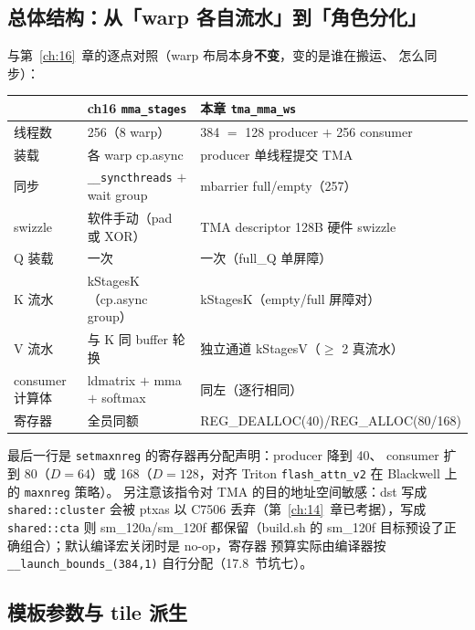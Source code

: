 \subsection{总体结构：从「warp 各自流水」到「角色分化」}

与第~\ref{ch:16}~章的逐点对照（warp 布局本身\textbf{不变}，变的是谁在搬运、
怎么同步）：

\begin{center}
\begin{tabular}{lll}
\toprule
 & ch16 \texttt{mma\_stages} & 本章 \texttt{tma\_mma\_ws} \\
\midrule
线程数 & 256（8 warp） & 384 $=$ 128 producer $+$ 256 consumer \\
装载 & 各 warp cp.async & producer 单线程提交 TMA \\
同步 & \texttt{\_\allowbreak{}\_\allowbreak{}syncthreads} $+$ wait group & mbarrier full/empty（257） \\
swizzle & 软件手动（pad 或 XOR） & TMA descriptor 128B 硬件 swizzle \\
Q 装载 & 一次 & 一次（full\_Q 单屏障） \\
K 流水 & kStagesK（cp.async group） & kStagesK（empty/full 屏障对） \\
V 流水 & 与 K 同 buffer 轮换 & 独立通道 kStagesV（$\ge$ 2 真流水） \\
consumer 计算体 & ldmatrix $+$ mma $+$ softmax & 同左（逐行相同） \\
寄存器 & 全员同额 & REG\_DEALLOC(40)/REG\_ALLOC(80/168) \\
\bottomrule
\end{tabular}
\end{center}

最后一行是 \texttt{setmaxnreg} 的寄存器再分配声明：producer 降到 40、
consumer 扩到 80（$D{=}64$）或 168（$D{=}128$，对齐 Triton
\texttt{flash\_attn\_v2} 在 Blackwell 上的 \texttt{maxnreg} 策略）。
另注意该指令对 TMA 的目的地址空间敏感：dst 写成 \texttt{shared::cluster}
会被 ptxas 以 C7506 丢弃（第~\ref{ch:14}~章已考据），写成
\texttt{shared::cta} 则 sm\_120a/sm\_120f 都保留（build.sh 的 sm\_120f
目标预设了正确组合）；默认编译宏关闭时是 no-op，寄存器
预算实际由编译器按 \texttt{\_\allowbreak{}\_\allowbreak{}launch\_\allowbreak{}bounds\_\allowbreak{}(384,\allowbreak{}1)} 自行分配（17.8~节坑七）。

\subsection{模板参数与 tile 派生}

